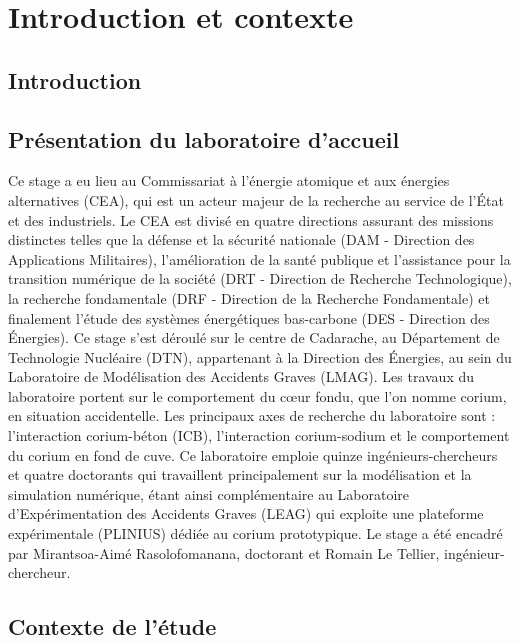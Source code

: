 \chapter{Introduction et contexte}
\section{Introduction}
\section{Présentation du laboratoire d'accueil}
Ce stage a eu lieu au Commissariat à l'énergie atomique et aux énergies alternatives (CEA), qui est un acteur majeur de la recherche au service de l'État et des industriels. Le CEA est divisé en quatre directions assurant des missions distinctes telles que la défense et la sécurité nationale (DAM - Direction des Applications Militaires), l'amélioration de la santé publique et l'assistance pour la transition numérique de la société (DRT - Direction de Recherche Technologique), la recherche fondamentale (DRF - Direction de la Recherche Fondamentale) et finalement l'étude des systèmes énergétiques bas-carbone (DES - Direction des Énergies). Ce stage s'est déroulé sur le centre de Cadarache, au Département de Technologie Nucléaire (DTN), appartenant à la Direction des Énergies, au sein du Laboratoire de Modélisation des Accidents Graves (LMAG). Les travaux du laboratoire portent sur le comportement du c\oe ur fondu, que l'on nomme corium, en situation accidentelle. Les principaux axes de recherche du laboratoire sont : l'interaction corium-béton (ICB), l'interaction corium-sodium et le comportement du corium en fond de cuve. Ce laboratoire emploie quinze ingénieurs-chercheurs et quatre doctorants qui travaillent principalement sur la modélisation et la simulation numérique, étant ainsi complémentaire au Laboratoire d'Expérimentation des Accidents Graves (LEAG) qui exploite une plateforme expérimentale (PLINIUS) dédiée au corium prototypique. Le stage a été encadré par Mirantsoa-Aimé Rasolofomanana, doctorant et Romain Le Tellier, ingénieur-chercheur.
\section{Contexte de l'étude}

